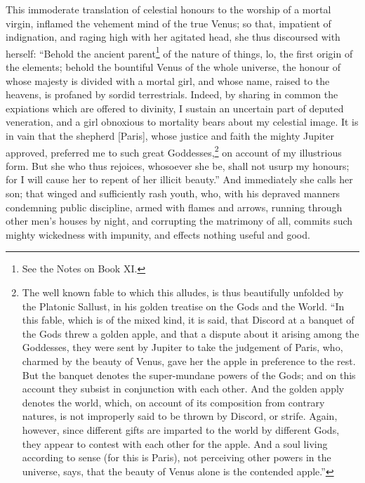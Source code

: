\documentclass{article}
\begin{document}
This immoderate translation of celestial honours to the worship of a mortal
virgin, inflamed the vehement mind of the true Venus; so that, impatient of
indignation, and raging high with her agitated head, she thus discoursed with
herself: ``Behold the ancient parent\footnote{See the Notes on Book XI.} of the
nature of things, lo, the first origin of the elements; behold the bountiful
Venus of the whole universe, the honour of whose majesty is divided with a
mortal girl, and whose name, raised to the heavens, is profaned by sordid
terrestrials. Indeed, by sharing in common the expiations which are offered to
divinity, I sustain an uncertain part of deputed veneration, and a girl
obnoxious to mortality bears about my celestial image. It is in vain that the
shepherd [Paris], whose justice and faith the mighty Jupiter approved,
preferred me to such great Goddesses,\footnote{The well known fable to which
this alludes, is thus beautifully unfolded by the Platonic Sallust, in his
golden treatise on the Gods and the World. ``In this fable, which is of the
mixed kind, it is said, that Discord at a banquet of the Gods threw a golden
apple, and that a dispute about it arising among the Goddesses, they were sent
by Jupiter to take the judgement of Paris, who, charmed by the beauty of Venus,
gave her the apple in preference to the rest. But the banquet denotes the
super-mundane powers of the Gods; and on this account they subsist in
conjunction with each other. And the golden apply denotes the world, which, on
account of its composition from contrary natures, is not improperly said to be
thrown by Discord, or strife. Again, however, since different gifts are
imparted to the world by different Gods, they appear to contest with each other
for the apple. And a soul living according to sense (for this is Paris), not
perceiving other powers in the universe, says, that the beauty of Venus alone
is the contended apple.''} on account of my illustrious form. But she who thus
rejoices, whosoever she be, shall not usurp my honours; for I will cause her to
repent of her illicit beauty.'' And immediately she calls her son; that winged
and sufficiently rash youth, who, with his depraved manners condemning public
discipline, armed with flames and arrows, running through other men's houses by
night, and corrupting the matrimony of all, commits such mighty wickedness with
impunity, and effects nothing useful and good.
\end{document}
